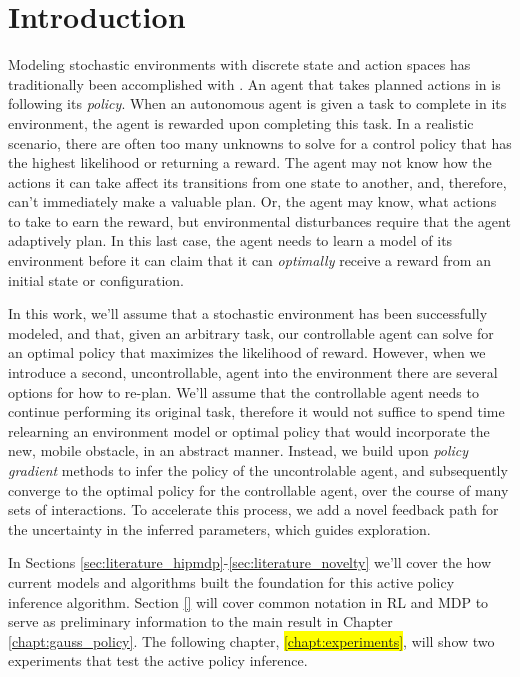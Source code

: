     \section{Introduction}\label{sec:introduction}

    Modeling stochastic environments with discrete state and action spaces has traditionally been accomplished with
    . An agent that takes planned actions in  is following its \textit{policy}. When an autonomous
    agent is given a task to complete in its environment, the agent is rewarded upon completing this task. In a
    realistic scenario, there are often too many unknowns to solve for a control policy that has the highest likelihood
    or returning a reward. The agent may not know how the actions it can take affect its transitions from one state to
    another, and, therefore, can't immediately make a valuable plan. Or, the agent may know, what actions to
    take to earn the reward, but environmental disturbances require that the agent adaptively plan. In this last case,
    the agent needs to learn a model of its environment before it can claim that it can \textit{optimally} receive a
    reward from an initial state or configuration.

    In this work, we'll assume that a stochastic environment has been successfully modeled, and that, given an arbitrary
    task, our controllable agent can solve for an optimal policy that maximizes the likelihood of reward. However, when
    we introduce a second, uncontrollable, agent into the environment there are several options for how to re-plan.
    We'll assume that the controllable agent needs to continue performing its original task, therefore it would not
    suffice to spend time relearning an environment model or optimal policy that would incorporate the new, mobile
    obstacle, in an abstract manner.  Instead, we build upon \textit{policy gradient} methods to infer the policy of the
    uncontrolable agent, and subsequently converge to the optimal policy for the controllable agent, over the course of
    many sets of interactions. To accelerate this process, we add a novel feedback path for the uncertainty in the
    inferred parameters, which guides exploration.

    In Sections \ref{sec:literature_hipmdp}-\ref{sec:literature_novelty} we'll cover the how current models and
    algorithms built the foundation for this active policy inference algorithm. Section \ref{} will cover common
    notation in \ac{RL} and \ac{MDP} to serve as preliminary information to the main result in Chapter
    \ref{chapt:gauss_policy}. The following chapter, \colorbox{yellow}{\ref{chapt:experiments}}, will show two
    experiments that test the active policy inference.


